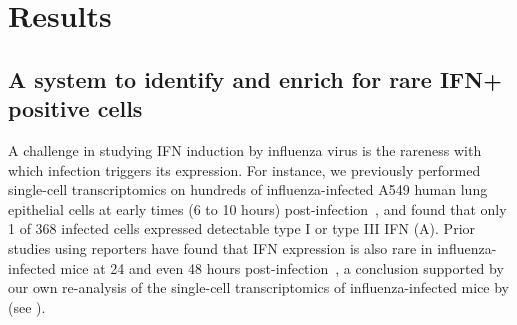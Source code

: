 \documentclass[9pt,lineno]{elife}
\begin{document}
\section{Results}

\subsection{A system to identify and enrich for rare IFN+ positive cells}
A challenge in studying IFN induction by influenza virus is the rareness with which infection triggers its expression.
For instance, we previously performed single-cell transcriptomics on hundreds of influenza-infected A549 human lung epithelial cells at early times (6 to 10 hours) post-infection~\citep{russell2018extreme}, and found that only 1 of 368 infected cells expressed detectable type I or type III IFN (A).
Prior studies using reporters have found that IFN expression is also rare in influenza-infected mice at 24 and even 48 hours post-infection~\citep{kallfass2013visualizing}, a conclusion supported by our own re-analysis of the single-cell transcriptomics of influenza-infected mice by \citet{steuerman2018dissection} (see ).
\end{document}
